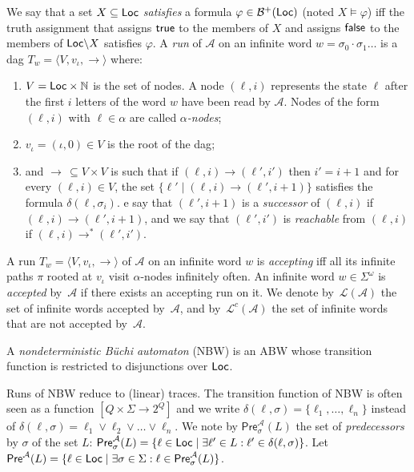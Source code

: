 \documentclass{LMCS}
\newcounter{compressEnum}
\renewcommand{\thecompressEnum}{$\roman{compressEnum}$}
\newenvironment{compressEnum}
{\setcounter{compressEnum}{0}}
\newcommand{\itCompress}{\stepcounter{compressEnum}{(\thecompressEnum) }}
\newcommand{\Pre}{\mathsf{Pre}}
\newcommand{\nat}{\mathbb N}
\renewcommand{\l}{{\ell}}
\newcommand{\Loc}{{\sf Loc}}
\newcommand{\tuple}[1]{\langle #1 \rangle}
\newcommand{\A}{\mathcal{A}}
\newcommand{\B}{\mathcal{B}}
\renewcommand{\L}{\mathcal{L}}
\newcommand{\DAG}{{\sc dag}}
\newcommand{\true}{{\sf true}}
\newcommand{\false}{{\sf false}}
\begin{document}
We say that a set $X \subseteq \Loc$ \emph{satisfies} a
formula $\varphi \in \B^+(\Loc)$ (noted $X \models \varphi$) iff the
truth assignment that assigns $\true$ to the members of $X$ and
assigns $\false$ to the members of $\Loc \backslash X$ satisfies
$\varphi$.  A \emph{run} of $\A$ on an infinite word $w =
\sigma_0\cdot\sigma_1 \dots$ is a \DAG\/ $T_w = \tuple{V, v_{\iota},
  \to}$ where:

\begin{enumerate}[$\bullet$]

\item $V = \Loc \times \nat$ is the set of nodes. A node $(\l,i)$ represents the
state $\l$ after the first $i$ letters of the word $w$ have been read by $\A$. 
Nodes of the form $(\l,i)$ with $\l \in \alpha$ are called \emph{$\alpha$-nodes};

\item $v_{\iota} = (\iota,0) \in V$ is the root of the \DAG;

\item and $\to\, \subseteq V \times V$ is such that \begin{compressEnum} 
\itCompress if $(\l,i)\to(\l',i')$ then $i'=i+1$ and 
\itCompress for every $(\l,i) \in V$, the set $\{\l' \mid (\l,i) \to (\l',i+1)\}$ 
satisfies the formula $\delta(\l,\sigma_i)$.
\end{compressEnum}
We say that $(\l',i+1)$ is a \emph{successor} of $(\l,i)$ if $(\l,i) \to (\l',i+1)$, 
and we say that $(\l',i')$ is \emph{reachable} from $(\l,i)$ if $(\l,i) \to^* (\l',i')$.

\end{enumerate}
\noindent
A run $T_w = \tuple{V, v_{\iota}, \to}$ of $\A$ on an infinite word $w$ is
\emph{accepting} iff all its infinite paths $\pi$ rooted at $v_{\iota}$
visit $\alpha$-nodes infinitely often.
An infinite word $w \in \Sigma^\omega$ is \emph{accepted} by~$\A$ if
there exists an accepting run on it. We denote by~$\L(\A)$ the set
of infinite words accepted by~$\A$, and by~$\L^c(\A)$  the set of infinite words that are not accepted by~$\A$.

\begin{defi}\label{def:NBW}
A \emph{nondeterministic B\"uchi automaton} (NBW) is an ABW whose
transition function is restricted to disjunctions over $\Loc$. 
\end{defi}

Runs of NBW reduce to (linear) traces.  The transition function of NBW is
often seen as a function $[Q \times \Sigma \to 2^Q]$ and we write
$\delta(\l,\sigma) = \{\l_1, \dots, \l_n\}$ instead of
$\delta(\l,\sigma) = \l_1 \lor \l_2 \lor \dots \lor \l_n$. 
We note by $\Pre^{\A}_{\sigma}(L)$ the set of \emph{predecessors} by $\sigma$ 
of the set $L$: $\Pre^{\A}_{\sigma}(L)=\{\l \in \Loc \mid \exists \l' \in L:
\l' \in \delta(\l,\sigma) \}$. Let $\Pre^{\A}(L) = \{\l \in \Loc \mid \exists
\sigma \in \Sigma: \l \in \Pre^{\A}_{\sigma}(L) \}$.
\end{document}
